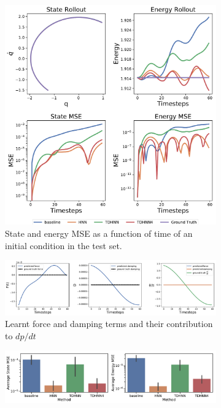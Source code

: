 \documentclass[twoside]{article}
\begin{document}
\begin{figure}[h!]
\centering
\captionsetup{justification=centering}
	\begin{subfigure}[b]{0.4\textwidth}
		\centering
		\includegraphics[width=\textwidth, trim={0 0 0 12cm},clip]{figures/figures/mass_spring/1/mass_spring_long_0.pdf}
		\caption{State and energy MSE as a function of time of an initial condition in the test set.}
	\end{subfigure}
	\begin{subfigure}[b]{0.48\textwidth}
		\centering
		\includegraphics[width=\textwidth]{figures/figures/mass_spring/1/mass_spring_dpdt_0.pdf}
		\caption{Learnt force and damping terms and their contribution to $dp/dt$}
	\end{subfigure}
	\begin{subfigure}[b]{0.48\textwidth}
	    \centering
		\includegraphics[width=\textwidth]{figures/figures/mass_spring/1/mass_spring_errors_0.pdf}

\end{subfigure}
\end{figure}
\end{document}
